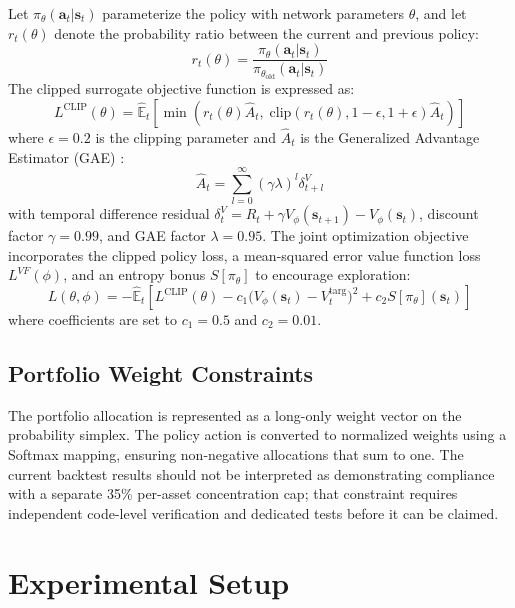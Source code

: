\documentclass[conference]{IEEEtran}
\begin{document}
Let $\pi_\theta(\mathbf{a}_t|\mathbf{s}_t)$ parameterize the policy with network parameters $\theta$, and let $r_t(\theta)$ denote the probability ratio between the current and previous policy:
\begin{equation}
    r_t(\theta) = \frac{\pi_\theta(\mathbf{a}_t | \mathbf{s}_t)}{\pi_{\theta_{\text{old}}}(\mathbf{a}_t | \mathbf{s}_t)}
\end{equation}
The clipped surrogate objective function is expressed as:
\begin{equation}
    L^{\text{CLIP}}(\theta) = \hat{\mathbb{E}}_t \left[ \min\left( r_t(\theta)\hat{A}_t, \; \text{clip}(r_t(\theta), 1-\epsilon, 1+\epsilon)\hat{A}_t \right) \right]
\end{equation}
where $\epsilon = 0.2$ is the clipping parameter and $\hat{A}_t$ is the Generalized Advantage Estimator (GAE) \cite{schulman2015high}:
\begin{equation}
    \hat{A}_t = \sum_{l=0}^{\infty} (\gamma \lambda)^l \delta_{t+l}^V
\end{equation}
with temporal difference residual $\delta_t^V = R_t + \gamma V_\phi(\mathbf{s}_{t+1}) - V_\phi(\mathbf{s}_t)$, discount factor $\gamma = 0.99$, and GAE factor $\lambda = 0.95$. The joint optimization objective incorporates the clipped policy loss, a mean-squared error value function loss $L^{VF}(\phi)$, and an entropy bonus $S[\pi_\theta]$ to encourage exploration:
\begin{equation}
    L(\theta, \phi) = -\hat{\mathbb{E}}_t \left[ L^{\text{CLIP}}(\theta) - c_1 \big( V_\phi(\mathbf{s}_t) - V_t^{\text{targ}} \big)^2 + c_2 S[\pi_\theta](\mathbf{s}_t) \right]
\end{equation}
where coefficients are set to $c_1 = 0.5$ and $c_2 = 0.01$.

\subsection{Portfolio Weight Constraints}
The portfolio allocation is represented as a long-only weight vector on the probability simplex. The policy action is converted to normalized weights using a Softmax mapping, ensuring non-negative allocations that sum to one. The current backtest results should not be interpreted as demonstrating compliance with a separate 35\% per-asset concentration cap; that constraint requires independent code-level verification and dedicated tests before it can be claimed.

\section{Experimental Setup}
\end{document}
